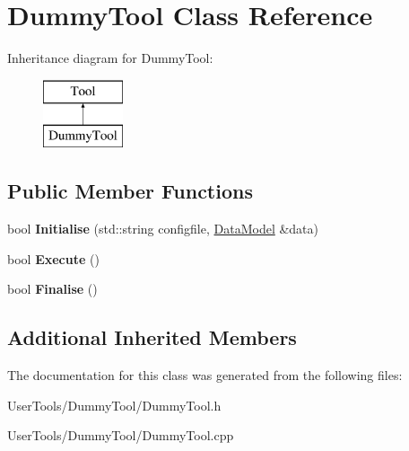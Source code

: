 \hypertarget{classDummyTool}{\section{Dummy\-Tool Class Reference}
\label{classDummyTool}
}
Inheritance diagram for Dummy\-Tool\-:\begin{figure}[H]
\begin{center}
\leavevmode
\includegraphics[height=2.000000cm]{classDummyTool}
\end{center}
\end{figure}
\subsection*{Public Member Functions}
\begin{DoxyCompactItemize}
\item 
\hypertarget{classDummyTool_a0d9cd781681a06ee3cf0cd1e7bb770a8}{bool {\bfseries Initialise} (std\-::string configfile, \hyperlink{classDataModel}{Data\-Model} \&data)}\label{classDummyTool_a0d9cd781681a06ee3cf0cd1e7bb770a8}

\item 
\hypertarget{classDummyTool_ac107b31f1785c1cc803e0e65be548047}{bool {\bfseries Execute} ()}\label{classDummyTool_ac107b31f1785c1cc803e0e65be548047}

\item 
\hypertarget{classDummyTool_aacb5d0b9906a27c2b4bba4aae9bc093a}{bool {\bfseries Finalise} ()}\label{classDummyTool_aacb5d0b9906a27c2b4bba4aae9bc093a}

\end{DoxyCompactItemize}
\subsection*{Additional Inherited Members}


The documentation for this class was generated from the following files\-:\begin{DoxyCompactItemize}
\item 
User\-Tools/\-Dummy\-Tool/Dummy\-Tool.\-h\item 
User\-Tools/\-Dummy\-Tool/Dummy\-Tool.\-cpp\end{DoxyCompactItemize}
